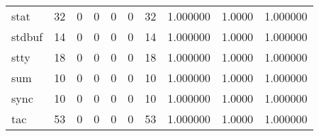 \begin{longtable}{lrrrrrrrrr}
stat      &                                       32 &                                                  0 &                                                  0 &                                                  0 &                                                  0 &                                                 32 &                                           1.000000 &                                 1.0000 &                             1.000000 \\
stdbuf    &                                       14 &                                                  0 &                                                  0 &                                                  0 &                                                  0 &                                                 14 &                                           1.000000 &                                 1.0000 &                             1.000000 \\
stty      &                                       18 &                                                  0 &                                                  0 &                                                  0 &                                                  0 &                                                 18 &                                           1.000000 &                                 1.0000 &                             1.000000 \\
sum       &                                       10 &                                                  0 &                                                  0 &                                                  0 &                                                  0 &                                                 10 &                                           1.000000 &                                 1.0000 &                             1.000000 \\
sync      &                                       10 &                                                  0 &                                                  0 &                                                  0 &                                                  0 &                                                 10 &                                           1.000000 &                                 1.0000 &                             1.000000 \\
tac       &                                       53 &                                                  0 &                                                  0 &                                                  0 &                                                  0 &                                                 53 &                                           1.000000 &                                 1.0000 &                             1.000000 \\

\end{longtable}
